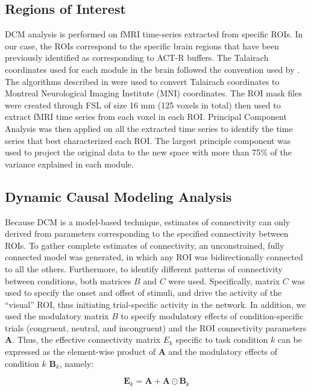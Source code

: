 \documentclass[10pt,letterpaper]{article}
\newcommand{\mat}[1]{\boldsymbol{#1}} %
\begin{document}
\subsection{Regions of Interest}

DCM analysis is performed on fMRI time-series extracted from specific ROIs. In our case, the ROIs correspond to the specific brain regions that have been previously identified as corresponding to ACT-R buffers. The Talairach coordinates used for each module in the brain followed the convention used by . The algorithms described in  were used to convert Talairach coordinates to Montreal Neurological Imaging Institute (MNI) coordinates. The ROI mask files were created through FSL \cite{Woolrich2009} of size 16 mm (125 voxels in total) then used to extract fMRI time series from each voxel in each ROI. Principal Component Analysis was then applied on all the extracted time series to identify the time series that best characterized each ROI. The largest principle component was used to project the original data to the new space with more than 75\% of the variance explained in each module. 

\subsection{Dynamic Causal Modeling Analysis}

Because DCM is a model-based technique, estimates of connectivity can only derived from parameters corresponding to the specified connectivity between ROIs.  To gather complete estimates of connectivity, an unconstrained, fully connected model was generated, in which any ROI was bidirectionally connected to all the others. Furthermore, to identify different patterns of connectivity between conditions, both matrices $B$ and $C$ were used. Specifically, matrix $C$ was used to specify the onset and offset of stimuli, and drive the activity  of the ``visual'' ROI, thus initiating trial-specific activity in the network. In addition, we used the modulatory matrix $B$ to specify modulatory effects of condition-specific trials (congruent, neutral, and incongruent) and the ROI connectivity parameters $\mat{A}$. Thus, the effective connectivity matrix $E_k$ specific to task condition $k$ can be expressed as the element-wise product of $\mat{A}$ and the modulatory effects of condition $k$ $\mat{B}_k$, namely:

\begin{equation}
\mat{E}_k = \mat{A} + \mat{A} \odot \mat{B}_k
\label{dcm:trick}
\end{equation}
\end{document}
